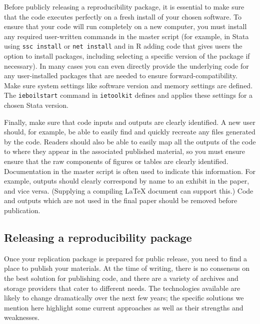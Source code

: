 Before publicly releasing a reproducibility package,
it is essential to make sure that the code executes perfectly on a fresh install of your chosen software.
To ensure that your code will run completely on a new computer,
you must install any required user-written commands in the master script
(for example, in Stata using \texttt{ssc install} or \texttt{net install}
and in R adding code that gives users the option to install packages,
including selecting a specific version of the package if necessary).
In many cases you can even directly provide the underlying code
for any user-installed packages that are needed to ensure forward-compatibility.
Make sure system settings like software version and memory settings are defined.
The \texttt{ieboilstart} command in \texttt{ietoolkit} defines and applies these settings 
for a chosen Stata version.  

Finally, make sure that code inputs and outputs are clearly identified.
A new user should, for example, be able to easily find and quickly recreate
any files generated by the code.
Readers should also be able to easily map all the outputs of the code
to where they appear in the associated published material,
so you must ensure ensure that the raw components of figures or tables are clearly identified.
Documentation in the master script is often used to indicate this information.
For example, outputs should clearly correspond by name to an exhibit in the paper, and vice versa.
(Supplying a compiling {\LaTeX} document can support this.)
Code and outputs which are not used in the final paper should be removed before publication.

\subsection{Releasing a reproducibility package}

Once your replication package is prepared for public release,
you need to find a place to publish your materials.
At the time of writing, there is no consensus on the best solution for publishing code,
and there are a variety of archives and storage providers
that cater to different needs.
The technologies available are likely to change dramatically
over the next few years;
the specific solutions we mention here highlight some current approaches
as well as their strengths and weaknesses.

